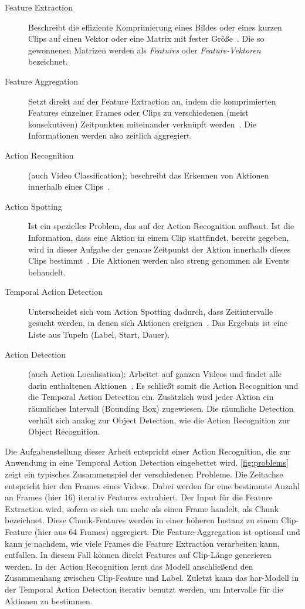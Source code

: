 \begin{description}
    \item[Feature Extraction]
    Beschreibt die effiziente Komprimierung eines Bildes oder eines kurzen Clips auf einen Vektor oder eine Matrix mit fester Größe~\cite{Tran14}.
    Die so gewonnenen Matrizen werden als \emph{Features} oder \emph{Feature-Vektoren} bezeichnet.
    \item[Feature Aggregation]
    Setzt direkt auf der Feature Extraction an, indem die komprimierten Features einzelner Frames oder Clips zu verschiedenen (meist konsekutiven) Zeitpunkten miteinander verknüpft werden~\cite{Ng15}.
    Die Informationen werden also zeitlich aggregiert.
    \item[Action Recognition]
    (auch Video Classification); beschreibt das Erkennen von Aktionen innerhalb eines Clips~\cite{Rodriguez08}.
    \item[Action Spotting]
    Ist ein spezielles Problem, das auf der Action Recognition aufbaut.
    Ist die Information, dass eine Aktion in einem Clip stattfindet, bereits gegeben, wird in dieser Aufgabe der genaue Zeitpunkt der Aktion innerhalb dieses Clips bestimmt~\cite{Giancola18}.
    Die Aktionen werden also streng genommen als Events behandelt.
    \item[Temporal Action Detection]
    Unterscheidet sich vom Action Spotting dadurch, dass Zeitintervalle gesucht werden, in denen sich Aktionen ereignen~\cite{Xia20}.
    Das Ergebnis ist eine Liste aus Tupeln (Label, Start, Dauer).
    \item[Action Detection]
    (auch Action Localisation): Arbeitet auf ganzen Videos und findet alle darin enthaltenen Aktionen~\cite{Xia20}.
    Es schließt somit die Action Recognition und die Temporal Action Detection ein.
    Zusätzlich wird jeder Aktion ein räumliches Intervall (Bounding Box) zugewiesen.
    Die räumliche Detection verhält sich analog zur Object Detection, wie die Action Recognition zur Object Recognition.
\end{description}


Die Aufgabenstellung dieser Arbeit entspricht einer Action Recognition, die zur Anwendung in eine Temporal Action Detection eingebettet wird.
\autoref{fig:problems} zeigt ein typisches Zusammenspiel der verschiedenen Probleme.
Die Zeitachse entspricht hier den Frames eines Videos.
Dabei werden für eine bestimmte Anzahl an Frames (hier 16) iterativ Features extrahiert.
Der Input für die Feature Extraction wird, sofern es sich um mehr als einen Frame handelt, als Chunk bezeichnet.
Diese Chunk-Features werden in einer höheren Instanz zu einem Clip-Feature (hier aus 64 Frames) aggregiert.
Die Feature-Aggregation ist optional und kann je nachdem, wie viele Frames die Feature Extraction verarbeiten kann, entfallen.
In diesem Fall können direkt Features auf Clip-Länge generieren werden.
In der Action Recognition lernt das Modell anschließend den Zusammenhang zwischen Clip-Feature und Label.
Zuletzt kann das \gls{har}-Modell in der Temporal Action Detection iterativ benutzt werden, um Intervalle für die Aktionen zu bestimmen.

